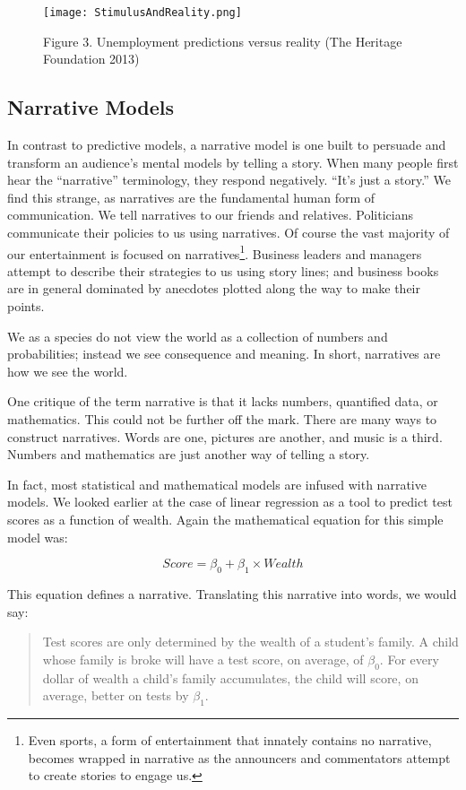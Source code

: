 \documentclass[]{memoir}
\let\Oldincludegraphics\includegraphics
\renewcommand{\includegraphics}[1]{\Oldincludegraphics[max size={\textwidth}{\textheight}]{#1}}
\begin{document}
\begin{figure}[htbp]
\centering
\texttt{[image: StimulusAndReality.png]}
\caption{Figure 3. Unemployment predictions versus reality (The Heritage
Foundation 2013)}
\end{figure}

\subsection{Narrative Models}

In contrast to predictive models, a narrative model is one built to
persuade and transform an audience's mental models by telling a story.
When many people first hear the ``narrative'' terminology, they respond
negatively. ``It's just a story.'' We find this strange, as narratives
are the fundamental human form of communication. We tell narratives to
our friends and relatives. Politicians communicate their policies to us
using narratives. Of course the vast majority of our entertainment is
focused on narratives\footnote{Even sports, a form of entertainment that
  innately contains no narrative, becomes wrapped in narrative as the
  announcers and commentators attempt to create stories to engage us.}.
Business leaders and managers attempt to describe their strategies to us
using story lines; and business books are in general dominated by
anecdotes plotted along the way to make their points.

We as a species do not view the world as a collection of numbers and
probabilities; instead we see consequence and meaning. In short,
narratives are how we see the world.

One critique of the term narrative is that it lacks numbers, quantified
data, or mathematics. This could not be further off the mark. There are
many ways to construct narratives. Words are one, pictures are another,
and music is a third. Numbers and mathematics are just another way of
telling a story.

In fact, most statistical and mathematical models are infused with
narrative models. We looked earlier at the case of linear regression as
a tool to predict test scores as a function of wealth. Again the
mathematical equation for this simple model was:

\[ Score = \beta_0 + \beta_1 \times Wealth \]

This equation defines a narrative. Translating this narrative into
words, we would say:

\begin{quote}
Test scores are only determined by the wealth of a student's family. A
child whose family is broke will have a test score, on average, of
$\beta_0$. For every dollar of wealth a child's family accumulates, the
child will score, on average, better on tests by $\beta_1$.
\end{quote}
\end{document}
